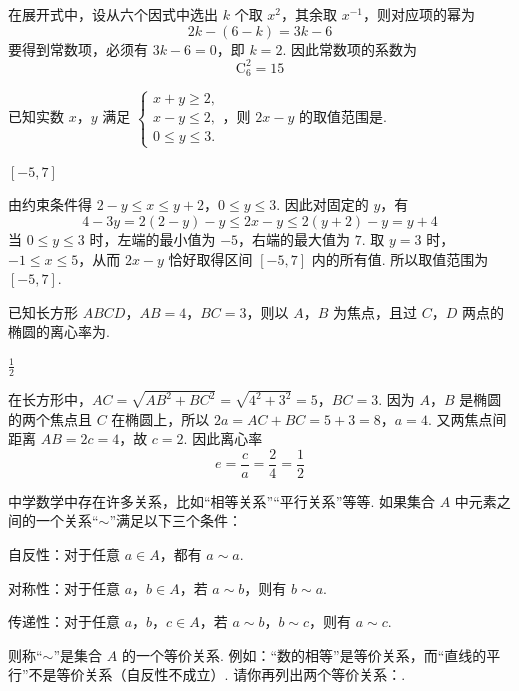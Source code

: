 \begin{solution}
在展开式中，设从六个因式中选出 \(k\) 个取 \(x^2\)，其余取 \(x^{-1}\)，则对应项的幂为
\[
2k-(6-k)=3k-6
\]
要得到常数项，必须有 \(3k-6=0\)，即 \(k=2\). 因此常数项的系数为
\[
\mathrm C_6^2=15
\]
\end{solution}

\begin{problem}
已知实数 \(x\)，\(y\) 满足 \(\begin{cases}
x + y \geqslant 2,\\
x - y \leqslant 2,\\
0 \leqslant y \leqslant 3.
\end{cases}\)，则 \(2x - y\) 的取值范围是\fillinblank{}.
\end{problem}

\begin{answer}
\(\left[-5, 7\right]\)
\end{answer}

\begin{solution}
由约束条件得
\(2-y\leqslant x\leqslant y+2\)，\(0\leqslant y\leqslant3\).
因此对固定的 \(y\)，有
\[
4-3y=2(2-y)-y\leqslant2x-y\leqslant2(y+2)-y=y+4
\]
当 \(0\leqslant y\leqslant3\) 时，左端的最小值为 \(-5\)，右端的最大值为 \(7\). 取 \(y=3\) 时，\(-1\leqslant x\leqslant5\)，从而 \(2x-y\) 恰好取得区间 \([-5,7]\) 内的所有值. 所以取值范围为 \(\left[-5,7\right]\).
\end{solution}

\begin{problem}
已知长方形 \(ABCD\)，\(AB = 4\)，\(BC = 3\)，则以 \(A\)，\(B\) 为焦点，且过 \(C\)，\(D\) 两点的椭圆的离心率为\fillinblank{}.
\end{problem}

\begin{answer}
\(\frac{1}{2}\)
\end{answer}

\begin{solution}
在长方形中，\(AC=\sqrt{AB^2+BC^2}=\sqrt{4^2+3^2}=5\)，\(BC=3\). 因为 \(A\)，\(B\) 是椭圆的两个焦点且 \(C\) 在椭圆上，所以
\(2a=AC+BC=5+3=8\)，\(a=4\).
又两焦点间距离 \(AB=2c=4\)，故 \(c=2\). 因此离心率
\[
e=\frac ca=\frac24=\frac12
\]
\end{solution}

\begin{problem}
中学数学中存在许多关系，比如“相等关系”“平行关系”等等. 如果集合 \(A\) 中元素之间的一个关系“\(\sim\)”满足以下三个条件：

\begin{circlelist}
\item 自反性：对于任意 \(a \in A\)，都有 \(a \sim a\).
\item 对称性：对于任意 \(a\)，\(b \in A\)，若 \(a \sim b\)，则有 \(b \sim a\).
\item 传递性：对于任意 \(a\)，\(b\)，\(c \in A\)，若 \(a \sim b\)，\(b \sim c\)，则有 \(a \sim c\).
\end{circlelist}

则称“\(\sim\)”是集合 \(A\) 的一个等价关系. 例如：“数的相等”是等价关系，而“直线的平行”不是等价关系（自反性不成立）. 请你再列出两个等价关系：\fillinblank{}.
\end{problem}

